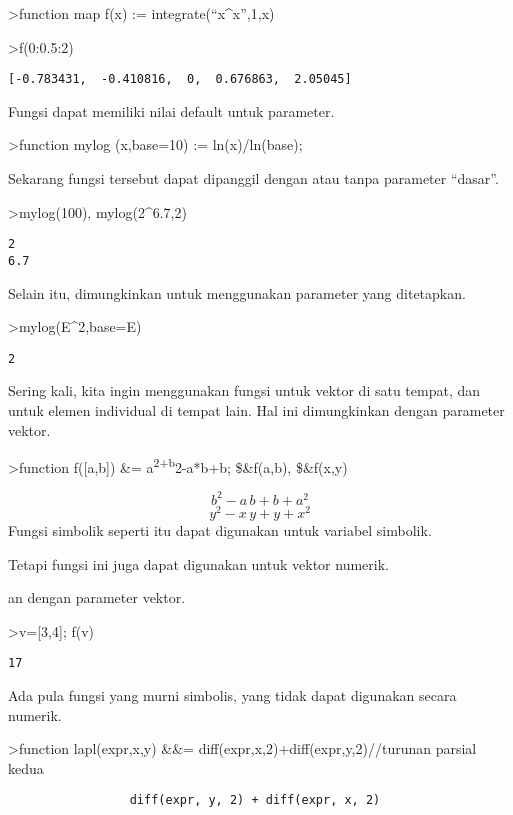 \documentclass[
]{book}
\begin{document}
\textgreater function map f(x) := integrate(``x\^{}x'',1,x)

\textgreater f(0:0.5:2)

\begin{verbatim}
[-0.783431,  -0.410816,  0,  0.676863,  2.05045]
\end{verbatim}

Fungsi dapat memiliki nilai default untuk parameter.

\textgreater function mylog (x,base=10) := ln(x)/ln(base);

Sekarang fungsi tersebut dapat dipanggil dengan atau tanpa parameter ``dasar''.

\textgreater mylog(100), mylog(2\^{}6.7,2)

\begin{verbatim}
2
6.7
\end{verbatim}

Selain itu, dimungkinkan untuk menggunakan parameter yang ditetapkan.

\textgreater mylog(E\^{}2,base=E)

\begin{verbatim}
2
\end{verbatim}

Sering kali, kita ingin menggunakan fungsi untuk vektor di satu tempat, dan untuk elemen individual di tempat lain. Hal ini dimungkinkan dengan parameter vektor.

\textgreater function f({[}a,b{]}) \&= a\textsuperscript{2+b}2-a*b+b; \$\&f(a,b), \$\&f(x,y)

\[b^2-a\,b+b+a^2\] \[y^2-x\,y+y+x^2\]Fungsi simbolik seperti itu dapat digunakan untuk variabel simbolik.

Tetapi fungsi ini juga dapat digunakan untuk vektor numerik.

an dengan parameter vektor.

\textgreater v={[}3,4{]}; f(v)

\begin{verbatim}
17
\end{verbatim}

Ada pula fungsi yang murni simbolis, yang tidak dapat digunakan secara numerik.

\textgreater function lapl(expr,x,y) \&\&= diff(expr,x,2)+diff(expr,y,2)//turunan parsial kedua

\begin{verbatim}
                 diff(expr, y, 2) + diff(expr, x, 2)
\end{verbatim}
\end{document}

